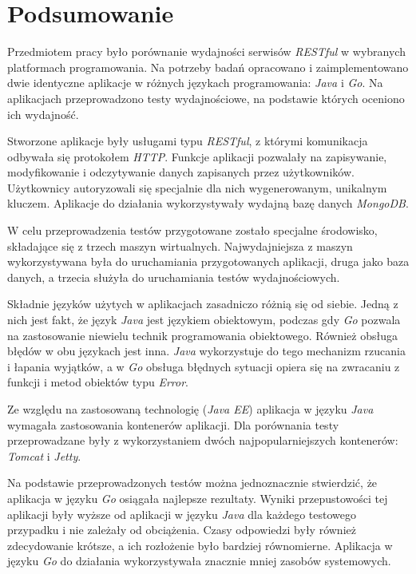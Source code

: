 \chapter{Podsumowanie}

Przedmiotem pracy było porównanie wydajności serwisów \textsl{RESTful} w wybranych platformach programowania. Na potrzeby badań opracowano i zaimplementowano dwie identyczne aplikacje w różnych językach programowania: \textsl{Java} i \textsl{Go}. Na aplikacjach przeprowadzono testy wydajnościowe, na podstawie których oceniono ich wydajność.

Stworzone aplikacje były usługami typu \textsl{RESTful}, z którymi komunikacja odbywała się protokołem \textsl{HTTP}. Funkcje aplikacji pozwalały na zapisywanie, modyfikowanie i odczytywanie danych  zapisanych przez użytkowników. Użytkownicy autoryzowali się specjalnie dla nich wygenerowanym, unikalnym kluczem. Aplikacje do działania wykorzystywały wydajną bazę danych \textsl{MongoDB}.

W celu przeprowadzenia testów przygotowane zostało specjalne środowisko, składające się z trzech maszyn wirtualnych. Najwydajniejsza z maszyn wykorzystywana była do uruchamiania przygotowanych aplikacji, druga jako baza danych, a  trzecia  służyła do uruchamiania testów wydajnościowych.

Składnie języków użytych w aplikacjach zasadniczo różnią się od siebie. Jedną z nich jest fakt, że język \textsl{Java} jest językiem obiektowym, podczas gdy \textsl{Go} pozwala na zastosowanie niewielu technik programowania obiektowego. Również obsługa błędów w obu językach jest inna. \textsl{Java} wykorzystuje do tego mechanizm rzucania i łapania wyjątków, a w \textsl{Go} obsługa błędnych sytuacji opiera się na zwracaniu z funkcji i metod obiektów typu \textsl{Error}.

Ze względu na zastosowaną technologię (\textsl{Java EE}) aplikacja w języku \textsl{Java} wymagała zastosowania kontenerów aplikacji. Dla porównania testy przeprowadzane były z wykorzystaniem dwóch najpopularniejszych kontenerów: \textsl{Tomcat} i \textsl{Jetty}. 
 
Na podstawie  przeprowadzonych testów można jednoznacznie stwierdzić, że aplikacja w języku \textsl{Go} osiągała najlepsze rezultaty. Wyniki przepustowości tej aplikacji były wyższe od aplikacji w języku \textsl{Java} dla każdego  testowego przypadku i nie zależały od obciążenia.  Czasy odpowiedzi były również zdecydowanie krótsze, a ich rozłożenie było bardziej równomierne. Aplikacja w języku \textsl{Go} do działania wykorzystywała znacznie mniej zasobów systemowych.    

